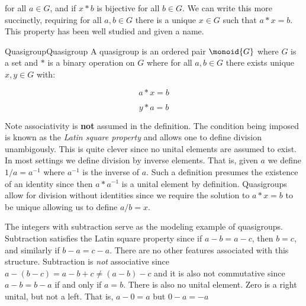         for all $a\in{G}$, and if $x*b$ is bijective for all $b\in{G}$. We can
        write this more succinctly, requiring for all $a,b\in{G}$ there is a
        unique $x\in{G}$ such that $a*x=b$. This property has been well studied
        and given a name.
        \begin{fdefinition}{Quasigroup}{Quasigroup}
            A quasigroup is an \gls{ordered pair} $\monoid{G}$ where $G$ is a
            \gls{set} and $*$ is a \gls{binary operation} on $G$ where for all
            $a,b\in{G}$ there exists unique $x,y\in{G}$ with:%
            \par\vspace{-2ex}
            \begin{minipage}[b]{0.49\textwidth}
                \centering
                \begin{equation}
                    \label{eqn:Quasigroup_Equation_Right}%
                    a*x=b\tag{1}
                \end{equation}
            \end{minipage}
            \begin{minipage}[b]{0.49\textwidth}
                \centering
                \begin{equation}
                    \label{eqn:Quasigroup_Equation_Left}%
                    y*a=b\tag{2}
                \end{equation}
            \end{minipage}
            \hfill
        \end{fdefinition}
        Note associativity is \textbf{not} assumed in the definition. The
        condition being imposed is known as the \textit{Latin square property}%
         and allows one to define division
        unambigously. This is quite clever since no unital elements are assumed
        to exist. In most settings we define division by inverse elements. That
        is, given $a$ we define $1/a=a^{\minus{1}}$ where $a^{\minus{1}}$ is the
        inverse of $a$. Such a definition presumes the existence of an identity
        since then $a*a^{\minus{1}}$ is a unital element by definition.
        Quasigroups allow for division without identities since we require the
        solution to $a*x=b$ to be unique allowing us to define $a/b=x$.
        \begin{example}
            The integers with subtraction serve as the modeling example of
            quasigroups. Subtraction satisfies the Latin square property since
            if $a-b=a-c$, then $b=c$, and similarly if $b-a=c-a$. There are no
            other features associated with this structure. Subtraction is
            \textit{not} associative since $a-(b-c)=a-b+c\ne(a-b)-c$ and it is
            also not commutative since $a-b=b-a$ if and only if $a=b$. There is
            also no unital element. Zero is a right unital, but not a left. That
            is, $a-0=a$ but $0-a=\minus{a}$
        \end{example}
